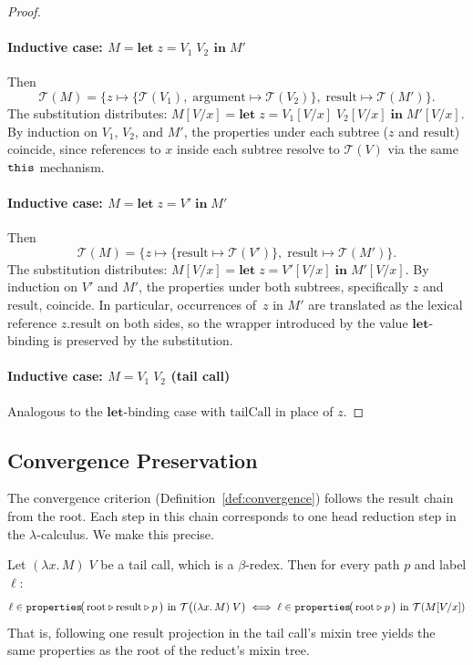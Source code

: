 \begin{proof}
  \paragraph{Inductive case:
    $M = \mathbf{let}\; z = V_1\; V_2$
  $\mathbf{in}\; M'$}
  Then
  \[
    \mathcal{T}(M) =
    \{z \mapsto \{\mathcal{T}(V_1),\;
      \mathrm{argument} \mapsto \mathcal{T}(V_2)\},\;
    \mathrm{result} \mapsto \mathcal{T}(M')\}.
  \]
  The substitution distributes:
  $M[V/x] =
  \mathbf{let}\; z = V_1[V/x]\; V_2[V/x]
  \;\mathbf{in}\; M'[V/x]$.
  By induction on $V_1$, $V_2$, and $M'$, the properties under
  each subtree ($z$ and $\mathrm{result}$) coincide,
  since references to $x$ inside each subtree resolve to
  $\mathcal{T}(V)$ via the same $\mathtt{this}$ mechanism.

  \paragraph{Inductive case:
    $M = \mathbf{let}\; z = V'
  \;\mathbf{in}\; M'$}
  Then
  \[
    \mathcal{T}(M) =
    \{z \mapsto \{\mathrm{result} \mapsto \mathcal{T}(V')\},\;
    \mathrm{result} \mapsto \mathcal{T}(M')\}.
  \]
  The substitution distributes:
  $M[V/x] =
  \mathbf{let}\; z = V'[V/x]
  \;\mathbf{in}\; M'[V/x]$.
  By induction on $V'$ and $M'$, the properties under both
  subtrees, specifically $z$ and $\mathrm{result}$, coincide.
  In particular, occurrences of~$z$ in $M'$ are translated as the
  lexical reference $z.\mathrm{result}$ on both sides, so the
  wrapper introduced by the value $\mathbf{let}$-binding is
  preserved by the substitution.

  \paragraph{Inductive case: $M = V_1\; V_2$ (tail call)}
  Analogous to the $\mathbf{let}$-binding case with
  $\mathrm{tailCall}$ in place of $z$.
\end{proof}

\subsection{Convergence Preservation}

The convergence criterion (Definition~\ref{def:convergence})
follows the $\mathrm{result}$ chain from the root.
Each step in this chain corresponds to one head reduction step
in the $\lambda$-calculus.
We make this precise.

\begin{lemma}\label{lem:result-step}
  Let $(\lambda x.\, M)\; V$ be a tail call, which is a $\beta$-redex.
  Then for every path $p$ and label $\ell$:
  \[
    \ell \in \mathtt{properties}\!\bigl(\,
    \text{root} \mathbin{\triangleright} \mathrm{result} \mathbin{\triangleright} p\,\bigr)
    \text{ in } \mathcal{T}\bigl((\lambda x.\, M)\; V\bigr)
    \;\Longleftrightarrow\;
    \ell \in \mathtt{properties}\!\bigl(\,
    \text{root} \mathbin{\triangleright} p\,\bigr)
    \text{ in } \mathcal{T}(M[V/x])
  \]
  That is, following one $\mathrm{result}$ projection in the
  tail call's mixin tree yields the same properties as the
  root of the reduct's mixin tree.
\end{lemma}

